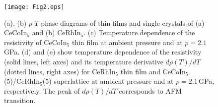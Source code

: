\documentclass[twocolumn,preprintnumbers,amsmath,amssymb,prl]{revtex4}
\begin{document}


 \begin{figure}[t]
 	\begin{center}
 		\texttt{[image: Fig2.eps]}
 		\caption{
		(a), (b) $p$-$T$ phase diagrams of thin films and single crystals of (a) CeCoIn$_5$  and (b) CeRhIn$_5$. 
		(c) Temperature dependence of the resistivity of CeCoIn$_5$ thin film at ambient pressure and at $p=2.1$\,GPa. (d) and (e) show temperature dependence of the resistivity (solid lines, left axes) and its temperature derivative $d\rho(T)/dT$ (dotted lines, right axes) for CeRhIn$_5$ thin film and CeCoIn$_5$(5)/CeRhIn$_5$(5) superlattice at ambient pressure and at $p=2.1$\,GPa, respectively. The peak of $d\rho(T)/dT$ corresponds to AFM transition.  
 		}
 		\label{fig:Fig1.eps}
 	\end{center}
 \end{figure}
\end{document}
